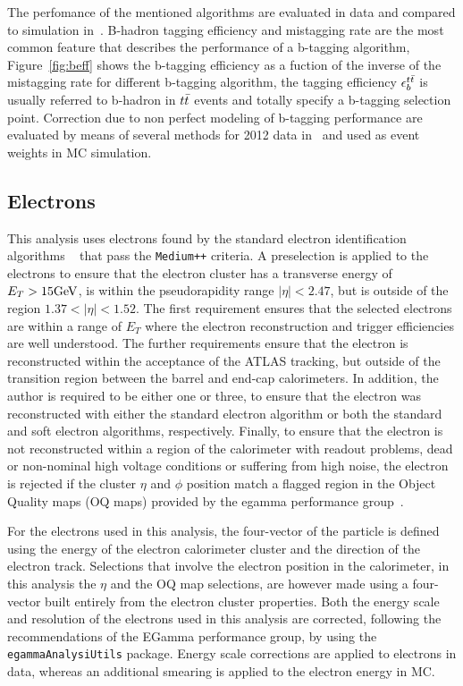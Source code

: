 The perfomance of the mentioned algorithms are evaluated in data  and compared to simulation in~\cite{btagPerf}.
B-hadron tagging efficiency and mistagging rate are the most common feature that describes the performance of a
b-tagging algorithm, Figure~\ref{fig:beff} shows the b-tagging efficiency as a fuction of the inverse of the mistagging rate
for different b-tagging algorithm, the tagging efficiency $\epsilon_b^{t\bar{t}}$ is usually referred to b-hadron in $t\bar{t}$ events
and totally specify a b-tagging selection point.
Correction due to non perfect modeling of b-tagging performance are evaluated by means of several methods
for 2012 data in~\cite{BtaggingScaleFactors, BtaggingScaleFactorsNew} and used as event weights in MC simulation.



\subsection{Electrons}
\label{sec:presel:elec}

This analysis uses electrons found by the standard electron
identification algorithms ~\cite{AtlasCSCBook} that pass the {\tt Medium++}
criteria. A preselection is applied to the electrons to ensure that
the electron cluster has a transverse energy of $E_T > 15\text{GeV}$, is
within the pseudorapidity range $|\eta|<2.47$, but is outside of the region
$1.37<|\eta|<1.52$. The first requirement ensures that the selected
electrons are within a range of $E_T$ where the electron reconstruction
and trigger efficiencies are well understood. The further requirements
ensure that the electron is reconstructed within the acceptance of
the ATLAS tracking, but outside of the transition region between the
barrel and end-cap calorimeters. 
In addition, the author is required to be either one or three, to ensure that the electron was 
reconstructed with either the standard electron algorithm or both the
standard and soft electron algorithms, respectively.
Finally, to ensure that the electron is not reconstructed within a region of the
calorimeter with readout problems, dead or non-nominal high voltage
conditions or suffering from high noise, the electron is rejected if
the cluster $\eta$ and $\phi$ position match a flagged region in the
Object Quality maps (OQ maps) provided by the egamma
performance group~\cite{EGammaRecomendations}.

For the electrons used in this analysis, the four-vector of the
particle is defined using the energy of the electron calorimeter
cluster and the direction of the electron track. Selections that
involve the electron position in the calorimeter, in this analysis the
$\eta$ and the OQ map selections, are however made using a four-vector built
entirely from the electron cluster properties. Both the energy scale
and resolution of the electrons used in this analysis are corrected,
following the recommendations of the EGamma performance group, by
using the {\tt egammaAnalysiUtils}
package\cite{EGammaRecomendations}. Energy scale corrections are
applied to electrons in data, whereas an additional smearing is
applied to the electron energy in MC.

